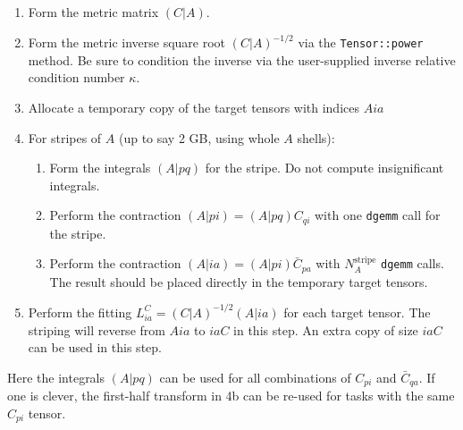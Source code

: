 \documentclass[fleqn,oneside,12pt]{article}
\begin{document}
\begin{enumerate}
\item{Form the metric matrix $(C|A)$.}
\item{Form the metric inverse square root $(C|A)^{-1/2}$ via the
\texttt{Tensor::power} method. Be sure to condition the inverse via the
user-supplied inverse relative condition number $\kappa$.}
\item{Allocate a temporary copy of the target tensors with indices $Aia$}
\item{For stripes of $A$ (up to say 2 GB, using whole $A$ shells):}
\begin{enumerate}
\item Form the integrals $(A|pq)$ for the stripe. Do not compute insignificant
integrals.
\item Perform the contraction $(A|pi) = (A|pq) C_{qi}$ with one \texttt{dgemm}
call for the stripe.
\item Perform the contraction $(A|ia) = (A|pi) \bar C_{pa}$ with
$N_{A}^{\mathrm{stripe}}$ \texttt{dgemm} calls. The result should be placed
directly in the temporary target tensors.
\end{enumerate}
\item Perform the fitting $L_{ia}^{C} = (C|A)^{-1/2} (A|ia)$ for each target
tensor. The striping will reverse from $Aia$ to $iaC$ in this step. An extra
copy of size $iaC$ can be used in this step. 
\end{enumerate}
Here the integrals $(A|pq)$ can be used for all combinations of $C_{pi}$ and
$\bar C_{qa}$. If one is clever, the first-half transform in 4b can be re-used
for tasks with the same $C_{pi}$ tensor. 
\end{document}
